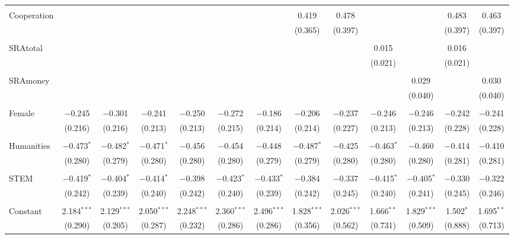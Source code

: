 \begin{subtables}
\begin{table}[H]
\begin{adjustbox}{width=\textwidth}
\begin{tabular}{@{\extracolsep{5pt}}lcccccccccccc}
  & & & & & & & & & & & & \\ 
 Cooperation &  &  &  &  &  &  & 0.419 & 0.478 &  &  & 0.483 & 0.463 \\ 
  &  &  &  &  &  &  & (0.365) & (0.397) &  &  & (0.397) & (0.397) \\ 
  & & & & & & & & & & & & \\ 
 SRAtotal &  &  &  &  &  &  &  &  & 0.015 &  & 0.016 &  \\ 
  &  &  &  &  &  &  &  &  & (0.021) &  & (0.021) &  \\ 
  & & & & & & & & & & & & \\ 
 SRAmoney &  &  &  &  &  &  &  &  &  & 0.029 &  & 0.030 \\ 
  &  &  &  &  &  &  &  &  &  & (0.040) &  & (0.040) \\ 
  & & & & & & & & & & & & \\ 
 Female & $-$0.245 & $-$0.301 & $-$0.241 & $-$0.250 & $-$0.272 & $-$0.186 & $-$0.206 & $-$0.237 & $-$0.246 & $-$0.246 & $-$0.242 & $-$0.241 \\ 
  & (0.216) & (0.216) & (0.213) & (0.213) & (0.215) & (0.214) & (0.214) & (0.227) & (0.213) & (0.213) & (0.228) & (0.228) \\ 
  & & & & & & & & & & & & \\ 
 Humanities & $-$0.473$^{*}$ & $-$0.482$^{*}$ & $-$0.471$^{*}$ & $-$0.456 & $-$0.454 & $-$0.448 & $-$0.487$^{*}$ & $-$0.425 & $-$0.463$^{*}$ & $-$0.460 & $-$0.414 & $-$0.410 \\ 
  & (0.280) & (0.279) & (0.280) & (0.280) & (0.280) & (0.279) & (0.279) & (0.280) & (0.280) & (0.280) & (0.281) & (0.281) \\ 
  & & & & & & & & & & & & \\ 
 STEM & $-$0.419$^{*}$ & $-$0.404$^{*}$ & $-$0.414$^{*}$ & $-$0.398 & $-$0.423$^{*}$ & $-$0.433$^{*}$ & $-$0.384 & $-$0.337 & $-$0.415$^{*}$ & $-$0.405$^{*}$ & $-$0.330 & $-$0.322 \\ 
  & (0.242) & (0.239) & (0.240) & (0.242) & (0.240) & (0.239) & (0.242) & (0.245) & (0.240) & (0.241) & (0.245) & (0.246) \\ 
  & & & & & & & & & & & & \\ 
 Constant & 2.184$^{***}$ & 2.129$^{***}$ & 2.050$^{***}$ & 2.248$^{***}$ & 2.360$^{***}$ & 2.496$^{***}$ & 1.828$^{***}$ & 2.026$^{***}$ & 1.666$^{**}$ & 1.829$^{***}$ & 1.502$^{*}$ & 1.695$^{**}$ \\ 
  & (0.290) & (0.205) & (0.287) & (0.232) & (0.286) & (0.286) & (0.356) & (0.562) & (0.731) & (0.509) & (0.888) & (0.713) \\ 

\end{tabular}
\end{adjustbox}
\end{table}
\end{subtables}

